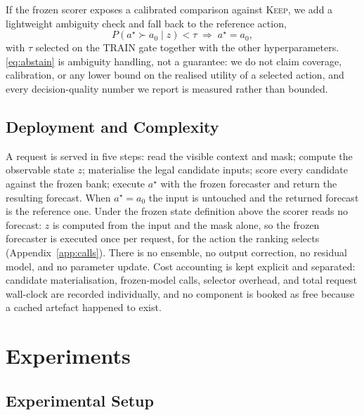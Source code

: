\documentclass{article}
\begin{document}
If the frozen scorer exposes a calibrated comparison against \textsc{Keep}, we add a
lightweight ambiguity check and fall back to the reference action,
\begin{equation}
  P(a^{\star} \succ a_0 \mid z) < \tau \;\Rightarrow\; a^{\star} = a_0 ,
  \label{eq:abstain}
\end{equation}
with $\tau$ selected on the TRAIN gate together with the other hyperparameters.
\eqref{eq:abstain} is ambiguity handling, not a guarantee: we do not claim coverage,
calibration, or any lower bound on the realised utility of a selected action, and every
decision-quality number we report is measured rather than bounded.

\subsection{Deployment and Complexity}
\label{sec:method-deploy}
A request is served in five steps: read the visible context and mask; compute the observable
state $z$; materialise the legal candidate inputs; score every candidate against the frozen
bank; execute $a^{\star}$ with the frozen forecaster and return the resulting forecast. When
$a^{\star} = a_0$ the input is untouched and the returned forecast is the reference one.
Under the frozen state definition above the scorer reads no forecast: $z$ is computed from
the input and the mask alone, so the frozen forecaster is executed once per request, for the
action the ranking selects (Appendix~\ref{app:calls}). There is no ensemble, no output
correction, no residual model, and no parameter update. Cost accounting is kept explicit and
separated: candidate materialisation, frozen-model calls, selector overhead, and total
request wall-clock are recorded individually, and no component is booked as free because a
cached artefact happened to exist.

\section{Experiments}
\label{sec:exp}

\subsection{Experimental Setup}
\label{sec:exp-setup}
\end{document}
